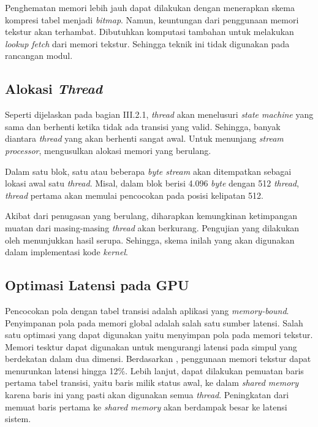       Penghematan memori lebih jauh dapat dilakukan dengan menerapkan skema kompresi tabel menjadi \emph{bitmap}. Namun, keuntungan dari penggunaan memori tekstur akan terhambat. Dibutuhkan komputasi tambahan untuk melakukan \emph{lookup fetch} dari memori tekstur. Sehingga teknik ini tidak digunakan pada rancangan modul.

      \subsection{Alokasi \emph{Thread}}

      Seperti dijelaskan pada bagian III.2.1, \emph{thread} akan menelusuri \emph{state machine} yang sama dan berhenti ketika tidak ada transisi yang valid. Sehingga, banyak diantara \emph{thread} yang akan berhenti sangat awal. Untuk menunjang \emph{stream processor}, \cite{lin2013} mengusulkan alokasi memori yang berulang.

      Dalam satu blok, satu atau beberapa \emph{byte stream} akan ditempatkan sebagai lokasi awal satu \emph{thread}. Misal, dalam blok berisi 4.096 \emph{byte} dengan 512 \emph{thread}, \emph{thread} pertama akan memulai pencocokan pada posisi kelipatan 512. 

      Akibat dari penugasan yang berulang, diharapkan kemungkinan ketimpangan muatan dari masing-masing \emph{thread} akan berkurang. Pengujian yang dilakukan oleh \cite{lin2013} menunjukkan hasil serupa. Sehingga, skema inilah yang akan digunakan dalam implementasi kode \emph{kernel}. %
      
      
      
      \subsection{Optimasi Latensi pada GPU}
      
      Pencocokan pola dengan tabel transisi adalah aplikasi yang \emph{memory-bound}. Penyimpanan pola pada memori global adalah salah satu sumber latensi. Salah satu optimasi yang dapat digunakan yaitu menyimpan pola pada memori tekstur. Memori tesktur dapat digunakan untuk mengurangi latensi pada simpul yang berdekatan dalam dua dimensi. Berdasarkan \cite{lin2013}, penggunaan memori tekstur dapat menurunkan latensi hingga 12\%. Lebih lanjut, dapat dilakukan pemuatan baris pertama tabel transisi, yaitu baris milik status awal, ke dalam \emph{shared memory} karena baris ini yang pasti akan digunakan semua \emph{thread}. Peningkatan dari memuat baris pertama ke \emph{shared memory} akan berdampak besar ke latensi sistem.
      
